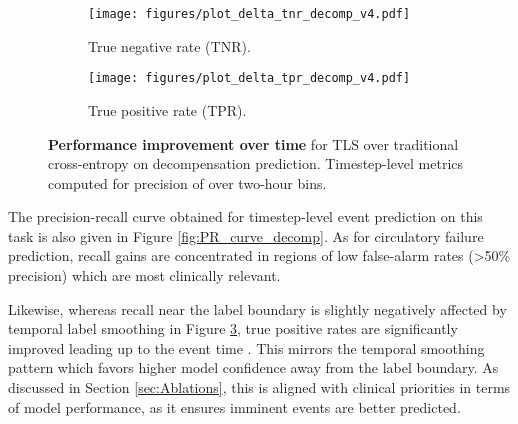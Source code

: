 \documentclass[nohyperref]{article}
\begin{document}
\begin{figure}[h]
\begin{subfigure}[b]{0.47\textwidth}
  \centering
  \texttt{[image: figures/plot\_delta\_tnr\_decomp\_v4.pdf]}\vspace{-0.5em}\caption{True negative rate (TNR).}
  \label{fig:delta_tnr_decomp}
\end{subfigure} \hfill
\begin{subfigure}[b]{0.47\textwidth}
 \centering
  \texttt{[image: figures/plot\_delta\_tpr\_decomp\_v4.pdf]}\vspace{-0.5em}\caption{True positive rate (TPR).}
  \label{fig:delta_tpr_decomp}
\end{subfigure}
\caption{\textbf{Performance improvement over time} for TLS over traditional cross-entropy on decompensation prediction. Timestep-level metrics computed for precision of  over two-hour bins.}
\vspace{-1em}
\label{fig:plot_delta_decomp}
\end{figure}

The precision-recall curve obtained for timestep-level event prediction on this task is also given in Figure \ref{fig:PR_curve_decomp}. As for circulatory failure prediction, recall gains are concentrated in regions of low false-alarm rates (>50\% precision) which are most clinically relevant. 

Likewise, whereas recall near the label boundary  is slightly negatively affected by temporal label smoothing in Figure \ref{fig:plot_delta_decomp}, true positive rates are significantly improved leading up to the event time . This mirrors the temporal smoothing pattern which favors higher model confidence away from the label boundary. As discussed in Section \ref{sec:Ablations}, this is aligned with clinical priorities in terms of model performance, as it ensures imminent events are better predicted.
\end{document}
